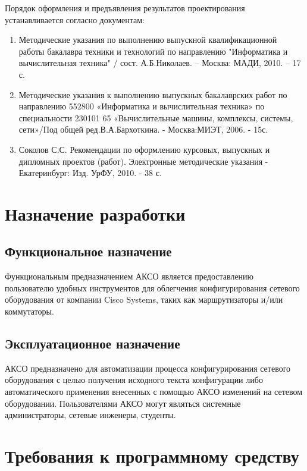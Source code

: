 \documentclass[a4paper,14pt]{extreport}
\begin{document}
	Порядок оформления и предъявления результатов проектирования устанавливается согласно документам:
	
	\begin{enumerate}
		\item  Методические указания по выполнению выпускной квалификационной работы бакалавра техники и технологий по направлению "Информатика и вычислительная техника" / сост. А.Б.Николаев. – Москва: МАДИ, 2010. – 17 с.
		\item Методические указания к выполнению выпускных бакалаврских работ по направлению 552800 «Информатика и вычислительная техника» по специальности 230101 65 «Вычислительные машины, комплексы, системы, сети»/Под общей ред.В.А.Бархоткина. - Москва:МИЭТ, 2006. - 15с.
		\item Соколов С.С. Рекомендации по оформлению курсовых, выпускных и дипломных проектов (работ). Электронные методические указания - Екатеринбург: Изд. УрФУ, 2010. - 38 с.
	\end{enumerate}
	
	
	\section{Назначение разработки}
	
	\subsection{Функциональное назначение}
	Функциональным предназначением АКСО является предоставлению пользователю удобных инструментов для облегчения конфигурирования сетевого оборудования от компании Cisco Systems, таких как маршрутизаторы и/или коммутаторы.
	
	\subsection{Эксплуатационное назначение}
	
	АКСО предназначено для автоматизации процесса конфигурирования сетевого оборудования с целью получения исходного текста конфигурации либо автоматического применения внесенных с помощью АКСО изменений на сетевом оборудовании. Пользователями АКСО могут являться системные администраторы, сетевые инженеры, студенты.
	
	\section{Требования к программному средству}
	
\end{document}
